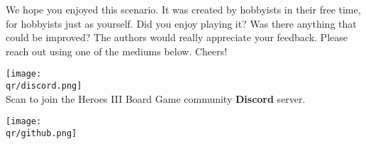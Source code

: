 

\vspace{\baselineskip}
We hope you enjoyed this scenario.  %
It was created by hobbyists in their free time, for hobbyists just as yourself.
Did you enjoy playing it?
Was there anything that could be improved?
The authors would really appreciate your feedback.
Please reach out using one of the mediums below.
Cheers!

\begin{multicols}{2}
  \bigbreak
  \centering
  \texttt{[image: \\qr/discord.png]}\\
  Scan to join the Heroes III Board Game community \textbf{Discord} server.\\
  \href{\discordurl}{\discordurl}

  \columnbreak
  \texttt{[image: \\qr/github.png]} \\
  \qrgithub \\
  \href{\repourl}{\repourl}
\end{multicols}

\vfill
\begin{center}
\end{center}
